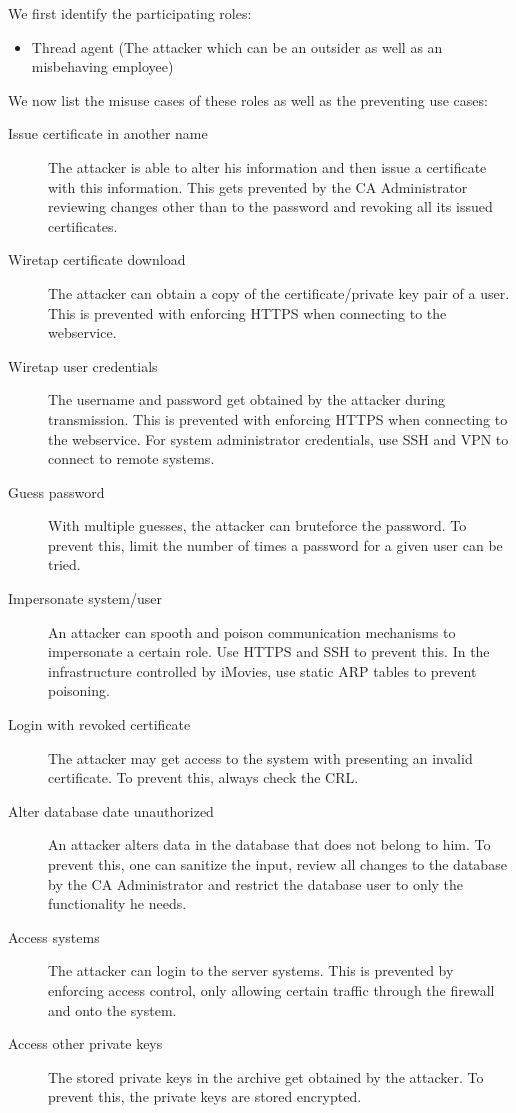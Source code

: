 \documentclass[a4paper, toc=index, 12pt, DIV14, twoside, BCOR2cm, headsepline, numbers=noenddot, bibliography=totoc]{scrbook}
\begin{document}
We first identify the participating roles:
\begin{itemize}
\item Thread agent (The attacker which can be an outsider as well as an misbehaving employee)
\end{itemize}
We now list the misuse cases of these roles as well as the preventing use cases:
\begin{description}
\item[Issue certificate in another name ] The attacker is able to alter his information and then issue a certificate with this information. This gets prevented by the CA Administrator reviewing changes other than to the password and revoking all its issued certificates.
\item[Wiretap certificate download ] The attacker can obtain a copy of the certificate/private key pair of a user. This is prevented with enforcing HTTPS when connecting to the webservice.
\item[Wiretap user credentials ] The username and password get obtained by the attacker during transmission. This is prevented with enforcing HTTPS when connecting to the webservice. For system administrator credentials, use SSH and VPN to connect to remote systems.
\item[Guess password ] With multiple guesses, the attacker can bruteforce the password. To prevent this, limit the number of times a password for a given user can be tried.
\item[Impersonate system/user ] An attacker can spooth and poison communication mechanisms to impersonate a certain role. Use HTTPS and SSH to prevent this. In the infrastructure controlled by iMovies, use static ARP tables to prevent poisoning.
\item[Login with revoked certificate ] The attacker may get access to the system with presenting an invalid certificate. To prevent this, always check the CRL.
\item[Alter database date unauthorized ] An attacker alters data in the database that does not belong to him. To prevent this, one can sanitize the input, review all changes to the database by the CA Administrator and restrict the database user to only the functionality he needs.
\item[Access systems ] The attacker can login to the server systems. This is prevented by enforcing access control, only allowing certain traffic through the firewall and onto the system.
\item[Access other private keys ] The stored private keys in the archive get obtained by the attacker. To prevent this, the private keys are stored encrypted.

\end{description}
\end{document}
